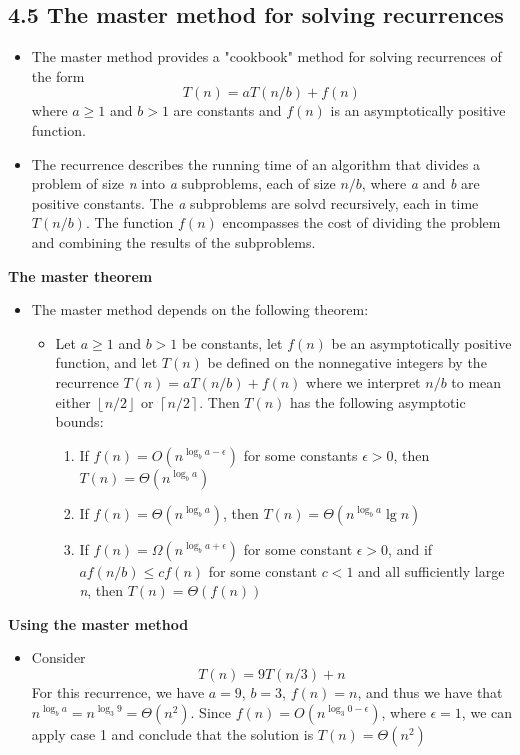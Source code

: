 \documentclass{report}
\begin{document}
\subsection*{4.5 The master method for solving recurrences}
\begin{itemize}
    \item The master method provides a "cookbook" method for solving recurrences of the form
    $$T(n) = aT(n/b) + f(n)$$
    where $a \geq 1$ and $b > 1$ are constants and $f(n)$ is an asymptotically positive function.
    \item The recurrence describes the running time of an algorithm that divides a problem of size \textit{n} into \textit{a} subproblems, each of size $n/b$, where \textit{a} and \textit{b} are positive constants. The \textit{a} subproblems are solvd recursively, each in time $T(n/b)$. The function $f(n)$ encompasses the cost of dividing the problem and combining the results of the subproblems.
\end{itemize}
\textbf{The master theorem}
\begin{itemize}
    \item The master method depends on the following theorem:
    \begin{itemize}
        \item Let $a \geq 1$ and $b > 1$ be constants, let $f(n)$ be an asymptotically positive function, and let $T(n)$ be defined on the nonnegative integers by the recurrence $T(n) = aT(n/b) + f(n)$ where we interpret $n/b$ to mean either $\left \lfloor{n/2} \right \rfloor$ or $\left \lceil{n/2} \right \rceil$. Then $T(n)$ has the following asymptotic bounds:
        \begin{enumerate}
            \item If $f(n) = O(n^{\log_b a -\epsilon})$ for some constants $\epsilon > 0$, then $T(n) = \Theta(n^{\log_b a})$
            \item If $f(n) = \Theta(n^{\log_b a})$, then $T(n) = \Theta(n^{\log_b a} \lg n)$
            \item If $f(n) = \Omega(n^{\log_b a + \epsilon})$ for some constant $\epsilon > 0$, and if $af(n/b) \leq cf(n)$ for some constant $c < 1$ and all sufficiently large \textit{n}, then $T(n) = \Theta(f(n))$
        \end{enumerate}
    \end{itemize}
\end{itemize}
\textbf{Using the master method}
\begin{itemize}
    \item Consider
    $$T(n) = 9T(n/3) + n$$
    For this recurrence, we have $a = 9$, $b = 3$, $f(n) = n$, and thus we have that $n^{\log_b a} = n^{\log_3 9} = \Theta(n^2)$. Since $f(n) = O(n^{\log_3 0 - \epsilon})$, where $\epsilon = 1$, we can apply case 1 and conclude that the solution is $T(n) = \Theta(n^2)$
\end{itemize}
\end{document}

